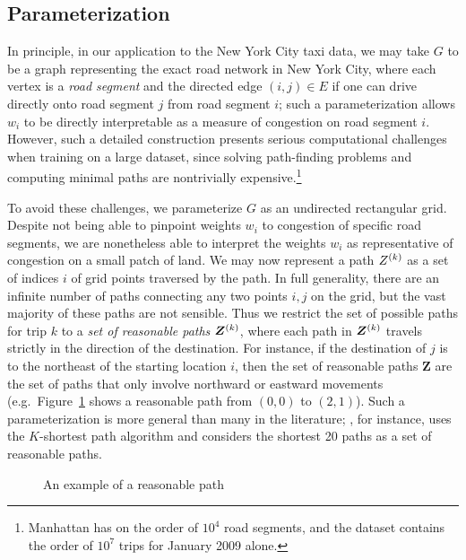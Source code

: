 \documentclass{article}
\begin{document}
\subsection{Parameterization}

In principle, in our application to the New York City taxi data, we may take $G$ to be a graph representing the exact road network in New York City, where each vertex is a \emph{road segment} and the directed edge $(i,j) \in E$ if one can drive directly onto road segment $j$ from road segment $i$; such a parameterization allows $w_i$ to be directly interpretable as a measure of congestion on road segment $i$. However, such a detailed construction presents serious computational challenges when training on a large dataset, since solving path-finding problems and computing minimal paths are nontrivially expensive.\footnote{Manhattan has on the order of $10^4$ road segments, and the dataset contains the order of $10^7$ trips for January 2009 alone.} 

To avoid these challenges, we parameterize $G$ as an undirected rectangular grid. Despite not being able to pinpoint weights $w_i$ to congestion of specific road segments, we are nonetheless able to interpret the weights $w_i$ as representative of congestion on a small patch of land. We may now represent a path $Z^{(k)}$ as a set of indices $i$ of grid points traversed by the path. In full generality, there are an infinite number of paths connecting any two points $i,j$ on the grid, but the vast majority of these paths are not sensible. Thus we restrict the set of possible paths for trip $k$ to a \emph{set of reasonable paths} $\bm Z^{(k)}$, where each path in $\bm Z^{(k)}$ travels strictly in the direction of the destination. For instance, if the destination of $j$ is to the northeast of the starting location $i$, then the set of reasonable paths $\bm Z$ are the set of paths that only involve northward or eastward movements (e.g.~Figure~\ref{fig:reasonable} shows a reasonable path from $(0,0)$ to $(2,1)$). Such a parameterization is more general than many in the literature; \citet{zhan2013urban}, for instance, uses the $K$-shortest path algorithm and considers the shortest 20 paths as a set of reasonable paths.

\begin{figure}[h]
\centering
\caption{An example of a reasonable path}
\vspace{1em}

\label{fig:reasonable}
\end{figure} 
\end{document}
